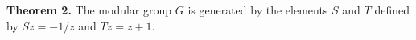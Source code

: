 \textbf{Theorem 2.} The modular group $G$ is generated by the elements $S$ and $T$ defined by $Sz = -1/z$ and $Tz = z+1$.
